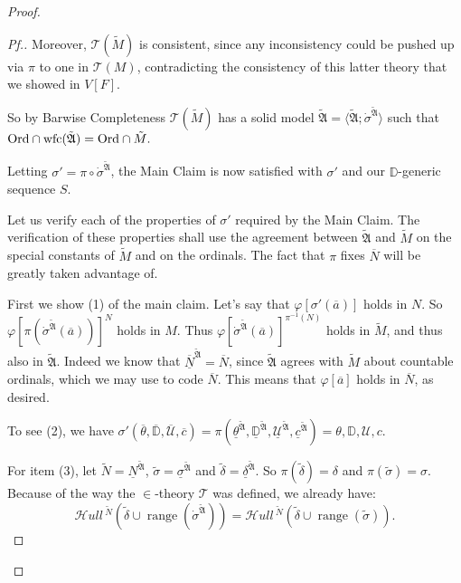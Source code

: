 \documentclass{amsart}
\theoremstyle{definition}
\theoremstyle{remark}
\newcommand{\D}{\mathbb{D}}
\newcommand{\N}{{\overline{N}}}
\newcommand{\U}{\mathcal{U}}
\newcommand{\Ord}{\textup{\ensuremath{\text{Ord}}}}
\DeclareMathOperator{\ran}{range}
\newcommand{\SH}{\mathcal{H}\textit{ull} \,}
\newcommand{\sk}[3]{\SH^{#1}( {#2} \cup {\ran(#3)} ) }
\begin{document}
\begin{proof}
\begin{proof}[Pf.]
Moreover, $\mathcal T(\tilde M)$ is consistent, since any inconsistency could be pushed up via $\pi$ to one in $\mathcal T(M)$, contradicting the consistency of this latter theory that we showed in $V[F]$.

So by Barwise Completeness $\mathcal T(\tilde M)$ has a solid model $\tilde{\mathfrak A} = \langle \tilde{\mathfrak A}; \dot{\sigma}^{\tilde{\mathfrak A}} \rangle$ such that $\text{Ord} \cap \text{wfc}(\tilde{\mathfrak A}) = \Ord \cap \tilde M.$

Letting $\sigma'=\pi \circ \dot{\sigma}^{\tilde{\mathfrak A}}$, the Main Claim is now satisfied with $\sigma'$ and our $\D$-generic sequence $S$.

Let us verify each of the properties of $\sigma'$ required by the Main Claim. The verification of these properties shall use the agreement between $\tilde{\mathfrak A}$ and $\tilde M$ on the special constants of $\tilde M$ and on the ordinals. The fact that $\pi$ fixes $\N$ will be greatly taken advantage of.

First we show (1) of the main claim. Let's say that $\varphi[\sigma'(\overline a)]$ holds in $N$. So $\varphi[\pi(\dot \sigma^{\tilde{\mathfrak A}}(\overline a))]^N$ holds in $M$. Thus $\varphi[\dot \sigma^{\tilde{\mathfrak A}}(\overline a)]^{\pi^{-1}(N)}$ holds in $\tilde M$, and thus also in $\tilde{\mathfrak A}$. Indeed we know that $\underline{\N}^{\tilde{\mathfrak A}} = \N$, since $\tilde{\mathfrak A}$ agrees with $\tilde M$ about countable ordinals, which we may use to code $\N$. 
This means that $\varphi[\overline a]$ holds in $\N$, as desired.

To see (2), we have $\sigma'(\overline \theta, \overline{\D}, \overline{\U}, \overline c)= \pi(\underline{\theta}^{\tilde{\mathfrak A}}, \underline{\D}^{\tilde{\mathfrak A}}, \underline{\U}^{\tilde{\mathfrak A}}, \underline{c}^{\tilde{\mathfrak A}})=\theta, \D, \U, c$.

For item (3), let $\tilde N = \underline N^{\tilde{\mathfrak A}}$, $\tilde \sigma = \underline \sigma^{\tilde{\mathfrak A}}$ and $\tilde \delta = \underline{\delta}^{\tilde{\mathfrak A}}$. So $\pi(\tilde \delta)= \delta$ and $\pi(\tilde \sigma)=\sigma$. Because of the way the $\in$-theory $\mathcal T$ was defined, we already have: 
\begin{equation}\label{eqn:SkDotSigma=SkTildeSigma} \sk{\tilde N}{\tilde \delta}{\dot \sigma^{\tilde{\mathfrak A}}} = \sk{\tilde N}{\tilde \delta}{\tilde \sigma}. \end{equation}


\end{proof}
\end{proof}
\end{document}

